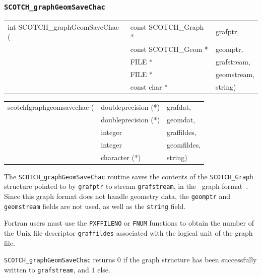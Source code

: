 \subsubsection{{\tt SCOTCH\_graphGeomSaveChac}}

\begin{itemize}
\progsyn

{\tt\begin{tabular}{l@{}ll}
int SCOTCH\_graphGeomSaveChac ( & const SCOTCH\_Graph * & grafptr, \\
                                & const SCOTCH\_Geom *  & geomptr, \\
                                & FILE *                & grafstream, \\
                                & FILE *                & geomstream, \\
                                & const char *          & string)
\end{tabular}}

{\tt\begin{tabular}{l@{}ll}
scotchfgraphgeomsavechac ( & doubleprecision (*) & grafdat,    \\
                           & doubleprecision (*) & geomdat,    \\
                           & integer             & graffildes, \\
                           & integer             & geomfildes, \\
                           & character (*)       & string)
\end{tabular}}

\progdes

The {\tt SCOTCH\_graphGeomSaveChac} routine saves the contents
of the {\tt SCOTCH\_\lbt Graph} structure pointed to by {\tt grafptr}
to stream {\tt graf\lbt stream}, in the \chaco\ graph
format~\cite{hele93c}. Since this graph format does
not handle geometry data, the {\tt geomptr} and {\tt geom\lbt stream}
fields are not used, as well as the {\tt string} field.

Fortran users must use the {\tt PXFFILENO} or {\tt FNUM} functions to
obtain the number of the Unix file descriptor {\tt graf\lbt fildes}
associated with the logical unit of the graph file.

\progret

{\tt SCOTCH\_graphGeomSaveChac} returns $0$ if the graph structure
has been successfully written to {\tt graf\lbt stream}, and $1$ else.
\end{itemize}

